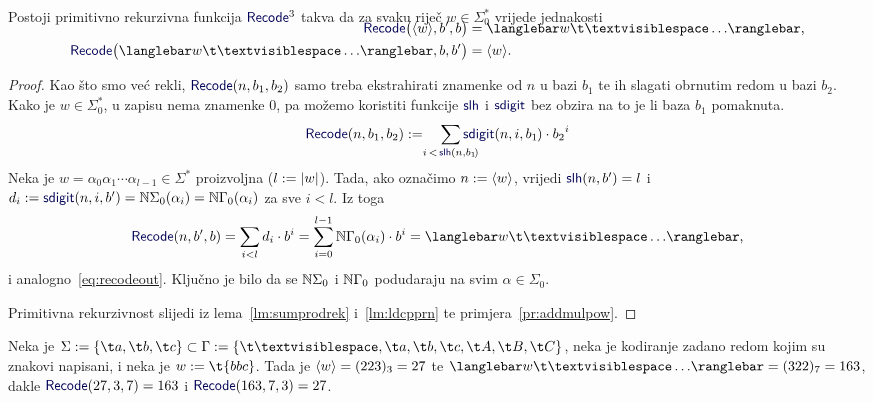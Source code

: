 \begin{lema}[{name=[primitivna rekurzivnost \emph{input\slash output} sustava trake]}]\label{lm:recodeprn}
Postoji primitivno rekurzivna funkcija $\f{Recode}^3$ takva da za svaku riječ $w\in\Sigma_0^*$ vrijede jednakosti
\begin{align}
\SwapAboveDisplaySkip
    \label{eq:recodein}\f{Recode}\bigl(\kr w,b',b\bigr)&=\knk{w\bl\ldots}\text,\\
    \label{eq:recodeout}\f{Recode}\bigl(\knk{w\bl\ldots},b,b'\bigr)&=\kr w\text.
\end{align}
\end{lema}
\begin{proof}
Kao što smo već rekli, $\f{Recode}(n,b_1,b_2)$ samo treba ekstrahirati znamenke od $n$ u bazi $b_1$ te ih slagati obrnutim redom u bazi $b_2$. Kako je $w\in\Sigma_0^*$, u zapisu nema znamenke $0$, pa
možemo koristiti funkcije $\f{slh}$ i $\f{sdigit}$ bez obzira na to je li baza $b_1$ pomaknuta.
\begin{equation}
	\f{Recode}(n,b_1,b_2):=\quad\sum_{\mathclap{i\,<\,\f{slh}(n,b_1\!)}}\f{sdigit}(n,i,b_1\mspace{-1mu})\cdot{b_2}^i
\end{equation}
Neka je $w=\alpha_0\alpha_1\dotsm\alpha_{l-1}\in\Sigma^*$ proizvoljna ($l:=\lvert w\rvert$). Tada, ako označimo $n:=\langle w\rangle$, vrijedi $\f{slh}(n,b')=l$ i $d_i:=\f{sdigit}(n,i,b')=\N\Sigma_0(\alpha_i)=\N\Gamma_0(\alpha_i)$ za sve $i<l$. Iz toga
\begin{equation}
    \f{Recode}(n,b',b)=\sum_{i<l}d_i\cdot b^i=\sum_{i=0}^{l-1}\N\Gamma_0(\alpha_i)\cdot b^i=\knk{w\bl\ldots}\text,
\end{equation}
i analogno~\eqref{eq:recodeout}. Ključno je bilo da se ${\mathbb N}\Sigma_0$ i ${\mathbb N}\Gamma_0$ podudaraju na svim $\alpha\in\Sigma_0$.

    Primitivna rekurzivnost slijedi iz lema~\ref{lm:sumprodrek} i~\ref{lm:ldcpprn} te primjera~\ref{pr:addmulpow}.
\end{proof}

\begin{primjer}[{name=[korištenje \emph{input\slash output} sustava trake]}]
Neka je $\Sigma:=\{\t a,\t b,\t c\}\subset\Gamma:=\{\bl,\t a,\t b,\t c,\t A,\t B,\t C\}$, neka je kodiranje zadano redom kojim su znakovi napisani, i neka je $w:=\t{bbc}$. Tada je $\langle w\rangle=(223)_3=27$ te $\knk{w\bl\ldots}=(322)_7=163$, dakle $\f{Recode}(27,3,7)=163$ i $\f{Recode}(163,7,3)=27$.
\end{primjer}


